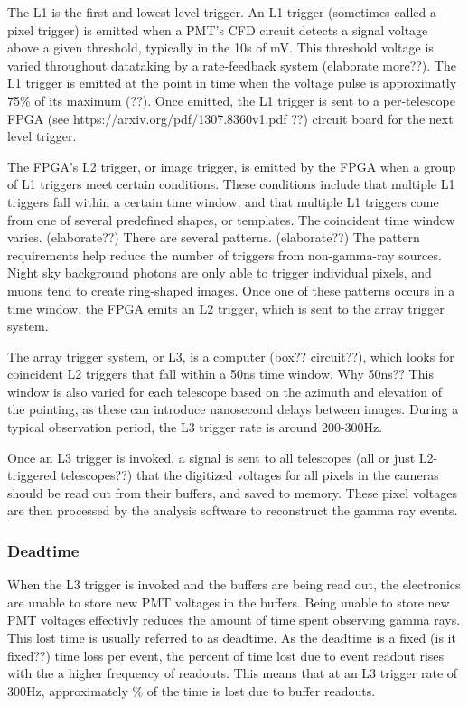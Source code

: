 The L1 is the first and lowest level trigger.
An L1 trigger (sometimes called a pixel trigger) is emitted when a PMT's CFD circuit detects a signal voltage above a given threshold, typically in the 10s of mV.
This threshold voltage is varied throughout datataking by a rate-feedback system (elaborate more??).
The L1 trigger is emitted at the point in time when the voltage pulse is approximatly 75\% of its maximum (??).
Once emitted, the L1 trigger is sent to a per-telescope FPGA (see https://arxiv.org/pdf/1307.8360v1.pdf ??) circuit board for the next level trigger.

The FPGA's L2 trigger, or image trigger, is emitted by the FPGA when a group of L1 triggers meet certain conditions.
These conditions include that multiple L1 triggers fall within a certain time window, and that multiple L1 triggers come from one of several predefined shapes, or templates.
The coincident time window varies. (elaborate??)
There are several patterns. (elaborate??)
The pattern requirements help reduce the number of triggers from non-gamma-ray sources.
Night sky background photons are only able to trigger individual pixels, and muons tend to create ring-shaped images.
Once one of these patterns occurs in a time window, the FPGA emits an L2 trigger, which is sent to the array trigger system.

The array trigger system, or L3, is a computer (box?? circuit??), which looks for coincident L2 triggers that fall within a \nicetilde50ns time window.
Why 50ns??
This window is also varied for each telescope based on the azimuth and elevation of the pointing, as these can introduce nanosecond delays between images.
During a typical observation period, the L3 trigger rate is around 200-300Hz.

Once an L3 trigger is invoked, a signal is sent to all telescopes (all or just L2-triggered telescopes??) that the digitized voltages for all pixels in the cameras should be read out from their buffers, and saved to memory.
These pixel voltages are then processed by the analysis software to reconstruct the gamma ray events.



\subsubsection{Deadtime}
When the L3 trigger is invoked and the buffers are being read out, the electronics are unable to store new PMT voltages in the buffers.
Being unable to store new PMT voltages effectivly reduces the amount of time spent observing gamma rays.
This lost time is usually referred to as deadtime.
As the deadtime is a fixed (is it fixed??) time loss per event, the percent of time lost due to event readout rises with the a higher frequency of readouts.
This means that at an L3 trigger rate of \nicetilde300Hz, approximately \% of the time is lost due to buffer readouts.

